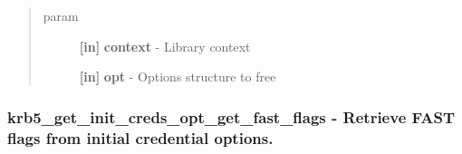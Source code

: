 \documentclass[letterpaper,10pt,english]{sphinxmanual}
\begin{document}
\begin{fulllineitems}
\label{appdev/refs/api/krb5_get_init_creds_opt_free:c.krb5_get_init_creds_opt_free}
\end{fulllineitems}

\begin{quote}\begin{description}
\item[{param}] \leavevmode
\textbf{{[}in{]}} \textbf{context} - Library context

\textbf{{[}in{]}} \textbf{opt} - Options structure to free

\end{description}\end{quote}




{\hyperref[appdev/refs/api/krb5_get_init_creds_opt_alloc:c.krb5_get_init_creds_opt_alloc]{}}




\subsubsection{krb5\_get\_init\_creds\_opt\_get\_fast\_flags -  Retrieve FAST flags from initial credential options.}
\label{appdev/refs/api/krb5_get_init_creds_opt_get_fast_flags::doc}\label{appdev/refs/api/krb5_get_init_creds_opt_get_fast_flags:krb5-get-init-creds-opt-get-fast-flags-retrieve-fast-flags-from-initial-credential-options}

\begin{fulllineitems}
\label{appdev/refs/api/krb5_get_init_creds_opt_get_fast_flags:c.krb5_get_init_creds_opt_get_fast_flags}
\end{fulllineitems}
\end{document}
